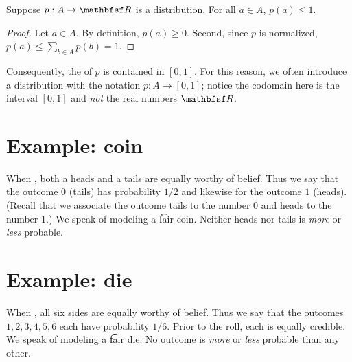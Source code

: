 \begin{proposition}
Suppose $p: A \to \R $ is a distribution.
For all $a \in A$, $p(a) \leq 1$.
\begin{proof}Let $a \in A$.
By definition, $p(a) \geq 0$.
Second, since $p$ is normalized, $p(a) \leq \sum_{b \in A} p(b) = 1$.\end{proof}\end{proposition}
Consequently, the of $p$ is contained in $[0,1]$.
For this reason, we often introduce a distribution with the notation $p: A \to [0,1]$; notice the codomain here is the interval $[0,1]$ and \textit{not} the real numbers $\R $.

\section*{Example: coin}

When , both a heads and a tails are equally worthy of belief.
Thus we say that the outcome $0$ (tails) has probability $1/2 $ and likewise for the outcome $1$ (heads).
(Recall that we associate the outcome tails to the number 0 and heads to the number 1.)
We speak of modeling a \t{fair coin}.
Neither heads nor tails is \textit{more} or \textit{less} probable.

\section*{Example: die}

When , all six sides are equally worthy of belief.
Thus we say that the outcomes $1, 2, 3, 4, 5, 6$ each have probability $1/6 $.
Prior to the roll, each is equally credible.
We speak of modeling a \t{fair die}.
No outcome is \textit{more} or \textit{less} probable than any other.
